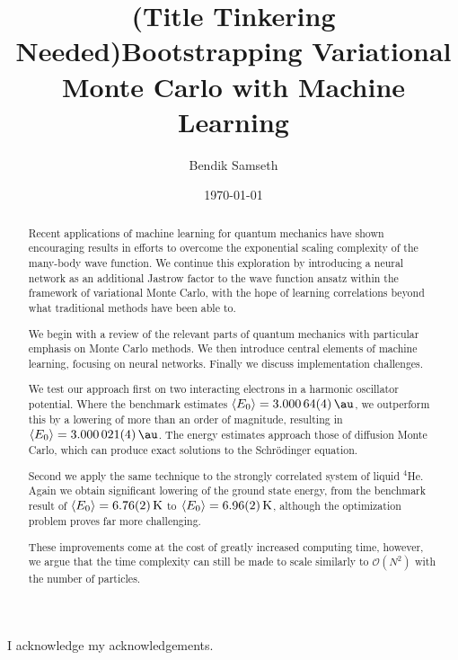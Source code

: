 \documentclass[twoside,english]{uiofysmaster}
\author{Bendik Samseth}
\title{(Title Tinkering Needed)Bootstrapping Variational Monte Carlo with Machine Learning}
\date{\monthyeardate\today}
\begin{document}
\maketitle

\begin{abstract}
Recent applications of machine learning for quantum mechanics have shown
encouraging results in efforts to overcome the exponential scaling complexity of
the many-body wave function. We continue this exploration by introducing a
neural network as an additional Jastrow factor to the wave function ansatz
within the framework of variational Monte Carlo, with the hope of learning
correlations beyond what traditional methods have been able to.

We begin with a review of the relevant parts of quantum mechanics with particular
emphasis on Monte Carlo methods. We then introduce central elements of machine
learning, focusing on neural networks. Finally we discuss implementation
challenges.

We test our approach first on two interacting electrons in a harmonic oscillator
potential. Where the benchmark estimates $\expval{E_0}=\SI{3.00064(4)}{\au}$, we
outperform this by a lowering of more than an order of magnitude, resulting in
$\expval{E_0}=\SI{3.000021(4)}{\au}$. The energy estimates approach those of
diffusion Monte Carlo, which can produce exact solutions to the Schrödinger equation.

Second we apply the same technique to the strongly correlated system of liquid
$^4$He. Again we obtain significant lowering of the ground state energy, from
the benchmark result of $\expval{E_0}=\SI{6.76(2)}{\kelvin}$ to
$\expval{E_0}=\SI{6.96(2)}{\kelvin}$, although the optimization problem proves far
more challenging.

These improvements come at the cost of greatly increased computing time,
however, we argue that the time complexity can still be made to scale similarly to
$\mathcal{O}(N^2)$ with the number of particles.
\end{abstract}



\begin{acknowledgements}
  I acknowledge my acknowledgements.
\end{acknowledgements}

\tableofcontents

\listoffigures
\begingroup
\let\clearpage\relax
\listoftables
\endgroup


\end{document}
